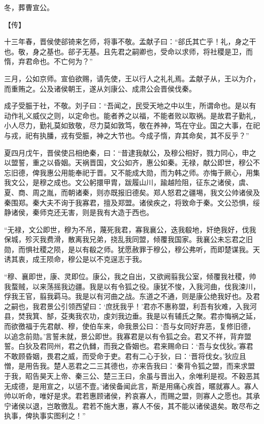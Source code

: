 \documentclass[a4paper,12pt,UTF8,twoside]{ctexbook}
\begin{document}
冬，葬曹宣公。

【传】

十三年春，晋侯使郤锜来乞师，将事不敬。孟献子曰：“郤氏其亡乎！礼，身之干也。敬，身之基也。郤子无基。且先君之嗣卿也，受命以求师，将社稷是卫，而惰，弃君命也。不亡何为？”

三月，公如京师。宣伯欲赐，请先使，王以行人之礼礼焉。孟献子从，王以为介，而重贿之。公及诸侯朝王，遂从刘康公、成肃公会晋侯伐秦。

成子受脤于社，不敬。刘子曰：“吾闻之，民受天地之中以生，所谓命也。是以有动作礼义威仪之则，以定命也。能者养之以福，不能者败以取祸。是故君子勤礼，小人尽力，勤礼莫如致敬，尽力莫如敦笃，敬在养神，笃在守业。国之大事，在祀与戎，祀有执膰，戎有受脤，神之大节也。今成子惰，弃其命矣，其不反乎？”

夏四月戊午，晋侯使吕相绝秦，曰：“昔逮我献公，及穆公相好，戮力同心，申之以盟誓，重之以昏姻。天祸晋国，文公如齐，惠公如秦。无禄，献公即世，穆公不忘旧德，俾我惠公用能奉祀于晋。又不能成大勋，而为韩之师。亦悔于厥心，用集我文公，是穆之成也。文公躬擐甲胄，跋履山川，踰越险阻，征东之诸侯，虞、夏、商、周之胤，而朝诸秦，则亦既报旧德矣。郑人怒君之疆埸，我文公帅诸侯及秦围郑。秦大夫不询于我寡君，擅及郑盟。诸侯疾之，将致命于秦。文公恐惧，绥静诸侯，秦师克还无害，则是我有大造于西也。

“无禄，文公即世，穆为不吊，蔑死我君，寡我襄公，迭我殽地，奸绝我好，伐我保城，殄灭我费滑，散离我兄弟，挠乱我同盟，倾覆我国家。我襄公未忘君之旧勋，而惧社稷之陨，是以有殽之师。犹愿赦罪于穆公，穆公弗听，而即楚谋我。天诱其衷，成王陨命，穆公是以不克逞志于我。

“穆、襄即世，康、灵即位。康公，我之自出，又欲阙翦我公室，倾覆我社稷，帅我蝥贼，以来荡摇我边疆。我是以有令狐之役。康犹不悛，入我河曲，伐我涑川，俘我王官，翦我羁马。我是以有河曲之战。东道之不通，则是康公绝我好也。及君之嗣也，我君景公引领西望曰：‘庶抚我乎！’君亦不惠称盟，利吾有狄难，入我河县，焚我箕、郜，芟夷我农功，虔刘我边垂。我是以有辅氏之聚。君亦悔祸之延，而欲徼福于先君献、穆，使伯车来，命我景公曰：‘吾与女同好弃恶，复修旧德，以追念前勋。’言誓未就，景公即世。我寡君是以有令狐之会。君又不祥，背弃盟誓。白狄及君同州，君之仇雠，而我之昏姻也。君来赐命曰：‘吾与女伐狄。’寡君不敢顾昏姻，畏君之威，而受命于吏。君有二心于狄，曰：‘晋将伐女。’狄应且憎，是用告我。楚人恶君之二三其德也，亦来告我曰：‘秦背令狐之盟，而来求盟于我，昭告昊天上帝、秦三公、楚三王曰，余虽与晋出入，余唯利是视。不穀恶其无成德，是用宣之，以惩不壹。’诸侯备闻此言，斯是用痛心疾首，暱就寡人。寡人帅以听命，唯好是求。君若惠顾诸侯，矜哀寡人，而赐之盟，则寡人之愿也。其承宁诸侯以退，岂敢徼乱。君若不施大惠，寡人不佞，其不能以诸侯退矣。敢尽布之执事，俾执事实图利之！”
\end{document}
